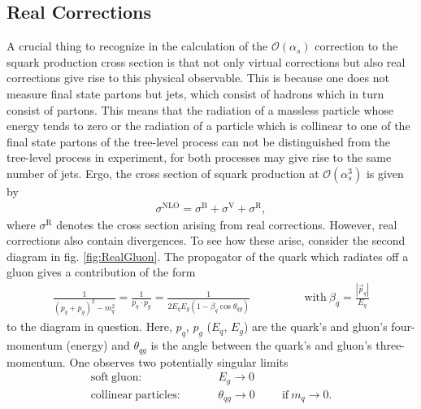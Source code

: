 \subsection{Real Corrections}
A crucial thing to recognize in the calculation of the $\mathcal{O}(\alpha_s)$ correction to the squark production cross section is that not only virtual corrections but also real corrections give rise to this physical observable. This is because one does not measure final state partons but jets, which consist of hadrons which in turn consist of partons. This means that the radiation of a massless particle whose energy tends to zero or the radiation of a particle which is collinear to one of the final state partons of the tree-level process can not be distinguished from the tree-level process in experiment, for both processes may give rise to the same number of jets. Ergo, the cross section of squark production at $\mathcal{O}(\alpha_s^3)$ is given by
\begin{align}
\sigma^{\mathrm{NLO}} = \sigma^{\mathrm{B}} + \sigma^{\mathrm{V}} + \sigma^{\mathrm{R}},
\end{align}
where $\sigma^{\mathrm{R}}$ denotes the cross section arising from real corrections. However, real corrections also contain divergences. To see how these arise, consider the second diagram in fig. \ref{fig:RealGluon}. The propagator of the quark which radiates off a gluon gives a contribution of the form
\begin{align}
\frac{1}{(p_q + p_g)^2 - m_q^2} = \frac{1}{p_q \cdot p_g} = \frac{1}{2E_qE_g(1-\beta_q \cos \theta_{qg})} \hspace{2cm} \mathrm{with}\ \beta_q = \frac{|\vec{p}_q|}{E_q}
\end{align}
to the diagram in question. Here, $p_q$, $p_g$ ($E_q$, $E_g$) are the quark's and gluon's four-momentum (energy) and $\theta_{qg}$ is the angle between the quark's and gluon's three-momentum. One observes two potentially singular limits
\begin{align}
\mathrm{soft\ gluon:}& \hspace{1cm} E_g \to 0\\
\mathrm{collinear\ particles:}& \hspace{1cm} \theta_{qg} \to 0 \hspace{1cm} \mathrm{if}\ m_q \to 0.\label{eq:collLimit}
\end{align}
